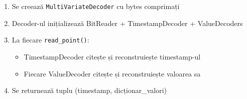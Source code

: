 \begin{enumerate}
    \item Se creează \texttt{MultiVariateDecoder} cu bytes comprimați
    \item Decoder-ul inițializează BitReader + TimestampDecoder + ValueDecoders
    \item La fiecare \texttt{read\_point()}:
    \begin{itemize}
        \item TimestampDecoder citește și reconstruiește timestamp-ul
        \item Fiecare ValueDecoder citește și reconstruiește valoarea sa
    \end{itemize}
    \item Se returnează tuplu (timestamp, dicționar\_valori)
\end{enumerate}